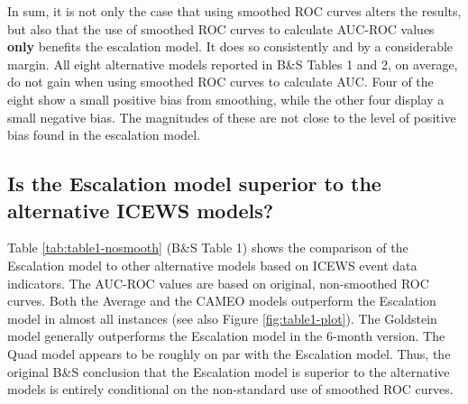 \documentclass[
]{article}
\begin{document}
In sum, it is not only the case that using smoothed ROC curves alters the results, but also that the use of smoothed ROC curves to calculate AUC-ROC values \textbf{only} benefits the escalation model. It does so consistently and by a considerable margin. All eight alternative models reported in B\&S Tables 1 and 2, on average, do not gain when using smoothed ROC curves to calculate AUC. Four of the eight show a small positive bias from smoothing, while the other four display a small negative bias. The magnitudes of these are not close to the level of positive bias found in the escalation model.

\hypertarget{is-the-escalation-model-superior-to-the-alternative-icews-models}{%
\subsection{Is the Escalation model superior to the alternative ICEWS models?}\label{is-the-escalation-model-superior-to-the-alternative-icews-models}}

Table \ref{tab:table1-nosmooth} (B\&S Table 1) shows the comparison of the Escalation model to other alternative models based on ICEWS event data indicators. The AUC-ROC values are based on original, non-smoothed ROC curves. Both the Average and the CAMEO models outperform the Escalation model in almost all instances (see also Figure \ref{fig:table1-plot}). The Goldstein model generally outperforms the Escalation model in the 6-month version. The Quad model appears to be roughly on par with the Escalation model. Thus, the original B\&S conclusion that the Escalation model is superior to the alternative models is entirely conditional on the non-standard use of smoothed ROC curves.
\end{document}
